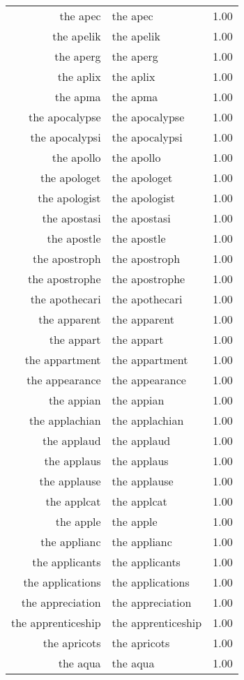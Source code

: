 \begin{table}[ht]
\begin{tabular}{rlr}
  the apec & the apec & 1.00 \\ 
  the apelik & the apelik & 1.00 \\ 
  the aperg & the aperg & 1.00 \\ 
  the aplix & the aplix & 1.00 \\ 
  the apma & the apma & 1.00 \\ 
  the apocalypse & the apocalypse & 1.00 \\ 
  the apocalypsi & the apocalypsi & 1.00 \\ 
  the apollo & the apollo & 1.00 \\ 
  the apologet & the apologet & 1.00 \\ 
  the apologist & the apologist & 1.00 \\ 
  the apostasi & the apostasi & 1.00 \\ 
  the apostle & the apostle & 1.00 \\ 
  the apostroph & the apostroph & 1.00 \\ 
  the apostrophe & the apostrophe & 1.00 \\ 
  the apothecari & the apothecari & 1.00 \\ 
  the apparent & the apparent & 1.00 \\ 
  the appart & the appart & 1.00 \\ 
  the appartment & the appartment & 1.00 \\ 
  the appearance & the appearance & 1.00 \\ 
  the appian & the appian & 1.00 \\ 
  the applachian & the applachian & 1.00 \\ 
  the applaud & the applaud & 1.00 \\ 
  the applaus & the applaus & 1.00 \\ 
  the applause & the applause & 1.00 \\ 
  the applcat & the applcat & 1.00 \\ 
  the apple & the apple & 1.00 \\ 
  the applianc & the applianc & 1.00 \\ 
  the applicants & the applicants & 1.00 \\ 
  the applications & the applications & 1.00 \\ 
  the appreciation & the appreciation & 1.00 \\ 
  the apprenticeship & the apprenticeship & 1.00 \\ 
  the apricots & the apricots & 1.00 \\ 
  the aqua & the aqua & 1.00 \\ 

\end{tabular}
\end{table}
